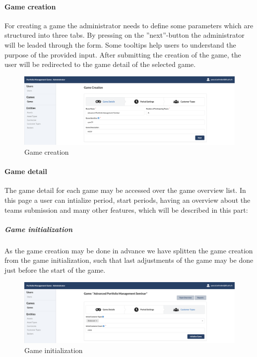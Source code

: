 \paragraph{Game creation}
For creating a game the administrator needs to define some parameters which are structured into three tabs. By pressing on the ''next''-button the administrator will be leaded through the form. Some tooltips help users to understand the purpose of the provided input. After submitting the creation of the game, the user will be redirected to the game detail of the selected game.
\begin{figure}[h!]
  \centering
  \includegraphics[scale=0.2]{img/application-overview/administrator/03_game_creation.png}
  \caption{Game creation}
\end{figure}


\paragraph{Game detail}
The game detail for each game may be accessed over the game overview list. In this page a user can intialize period, start periods, having an overview about the teams submission and many other features, which will be described in this part:

\subparagraph{Game initialization}
As the game creation may be done in advance we have splitten the game creation from the game initialization, such that last adjustments of the game may be done just before the start of the game.
\begin{figure}[h!]
  \centering
  \includegraphics[scale=0.2]{img/application-overview/administrator/04_game_initialization.png}
  \caption{Game initialization}
\end{figure}

